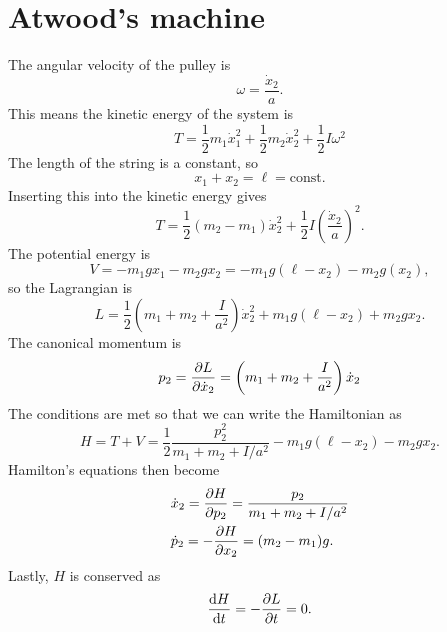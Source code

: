 \documentclass{article}
\begin{document}
    \section{Atwood's machine}
        The angular velocity of the pulley is 
        \begin{equation*}
            \omega = \frac{\dot x_2}{a}.
        \end{equation*}
        This means the kinetic energy of the system is 
        \begin{equation*}
            T = \frac{1}{2}m_1\dot x_1^2+\frac{1}{2}m_2\dot x_2^2 + \frac{1}{2}I \omega^2
        \end{equation*}
        The length of the string is a constant, so 
        \begin{equation*}
            x_1 + x_2 = \ell = \mathrm{const.}
        \end{equation*}
        Inserting this into the kinetic energy gives 
        \begin{equation*}
            T = \frac{1}{2}(m_2-m_1)\dot x_2^2 + \frac{1}{2}I \left(\frac{\dot x_2}{a}\right)^2.
        \end{equation*}
        The potential energy is
        \begin{equation*}
            V = - m_1 g x_1 - m_2 g x_2 = -m_1g(\ell -x_2) - m_2g(x_2),
        \end{equation*}
        so the Lagrangian is
        \begin{equation*}
            L = \frac{1}{2}\left(m_1 + m_2 + \frac{I}{a^2}\right) \dot x_2^2 + m_1g(\ell - x_2) + m_2 g x_2.
        \end{equation*}
        The canonical momentum is
        \begin{equation*}
            p_{2} = \pdv{L}{\dot x_2} = \left(m_1 + m_2 + \frac{I}{a^2}\right) \dot x_ 2
        \end{equation*}
        The conditions are met so that we can write the Hamiltonian as
        \begin{equation*}
            H = T + V = \frac{1}{2}\frac{p_2^2}{m_1 + m_2 + I/a^2} -m_1g(\ell - x_2) - m_2 g x_2.
        \end{equation*}
        Hamilton's equations then become
        \begin{align*}
            & \dot x_2 = \pdv{H}{p_2} = \frac{p_2}{m_1 + m_2 + I/a^2} \\
            & \dot p_2 = - \pdv{H}{x_2} = (m_2 - m_1)g.
        \end{align*}
        Lastly, $H$ is conserved as
        \begin{equation*}
            \dv{H}{t} = -\pdv{L}{t} = 0.
        \end{equation*}
\end{document}
